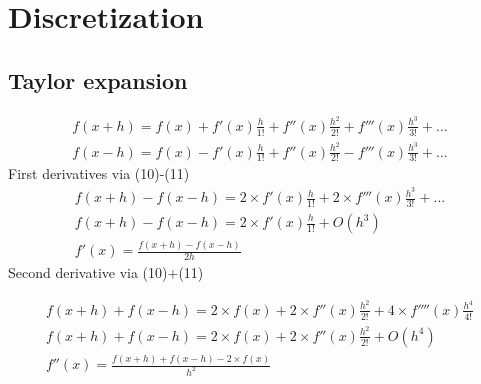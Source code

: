 \documentclass[11pt,dvips]{article}
\numberwithin{equation}{section}
\begin{document}
\section{Discretization}
\subsection{Taylor expansion} 
\begin{align*}
f(x+h)=f(x)+f'(x)\frac{h}{1!}+f''(x)\frac{h^2}{2!}+f'''(x)\frac{h^3}{3!}+... \tag{10} \\
f(x-h)=f(x)-f'(x)\frac{h}{1!}+f''(x)\frac{h^2}{2!}-f'''(x)\frac{h^3}{3!}+... \tag{11} 
\end{align*}
First derivatives via (10)-(11)
\begin{align*}
f(x+h)-f(x-h)=2\times f'(x)\frac{h}{1!}+2 \times f'''(x)\frac{h^3}{3!}+... \\
f(x+h)-f(x-h)=2\times f'(x)\frac{h}{1!}+O(h^3) \\
f'(x)=\frac{f(x+h)-f(x-h)}{2h} 
\tag{12}
\end{align*}
Second derivative via (10)+(11)

\begin{align*}
f(x+h)+f(x-h)=2\times f(x)+2 \times f''(x)\frac{h^2}{2!}+4 \times f''''(x)\frac{h^4}{4!} \\
f(x+h)+f(x-h)=2\times f(x)+2 \times f''(x)\frac{h^2}{2!}+O(h^4) \\
f''(x)=\frac{f(x+h)+f(x-h)-2\times f(x)}{h^2}
\tag{13}
\end{align*}
\end{document}

